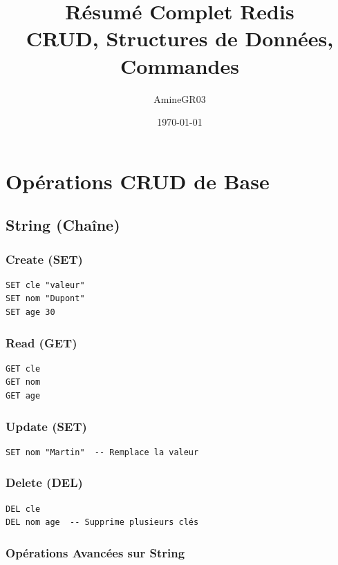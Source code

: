 \documentclass[11pt,a4paper]{article}
\title{Résumé Complet Redis\\
\large CRUD, Structures de Données, Commandes}
\author{AmineGR03}
\date{\today}
\begin{document}
\maketitle

\tableofcontents
\newpage

\section{Opérations CRUD de Base}

\subsection{String (Chaîne)}

\subsubsection{Create (SET)}

\begin{lstlisting}
SET cle "valeur"
SET nom "Dupont"
SET age 30
\end{lstlisting}

\subsubsection{Read (GET)}

\begin{lstlisting}
GET cle
GET nom
GET age
\end{lstlisting}

\subsubsection{Update (SET)}

\begin{lstlisting}
SET nom "Martin"  -- Remplace la valeur
\end{lstlisting}

\subsubsection{Delete (DEL)}

\begin{lstlisting}
DEL cle
DEL nom age  -- Supprime plusieurs clés
\end{lstlisting}

\subsubsection{Opérations Avancées sur String}
\end{document}
